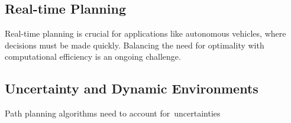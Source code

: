 \documentclass{article}
\begin{document}
\subsection{Real-time Planning} 
Real-time planning is crucial for applications like autonomous vehicles, where decisions must be made quickly. Balancing the need for optimality with computational efficiency is an ongoing challenge. 
 
\subsection{Uncertainty and Dynamic Environments} 
Path planning algorithms need to account for uncertainties
\end{document}

